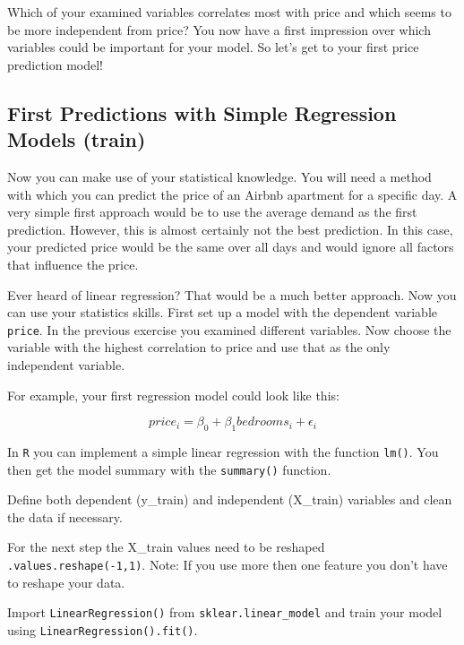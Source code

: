 \documentclass[
  11pt,
]{article}
\newenvironment{tips}[1]
  {
  \begin{itemize}
  \footnotesize
  \renewcommand{\labelitemi}{
    \raisebox{-.7\height}[0pt][0pt]{
      {\setkeys{Gin}{width=3em,keepaspectratio}
        \texttt{[image: images/\#1.png]}}
    }
  }
  \setlength{\fboxsep}{1em}
  \begin{rbox}
  \item
  }
  {
  \end{rbox}
  \end{itemize}
  }
\newenvironment{tipsp}[1]
  {
  \begin{itemize}
  \footnotesize
  \renewcommand{\labelitemi}{
    \raisebox{-.7\height}[0pt][0pt]{
      {\setkeys{Gin}{width=3em,keepaspectratio}
        \texttt{[image: images/\#1.png]}}
    }
  }
  \setlength{\fboxsep}{1em}
  \begin{pbox}
  \item
  }
  {
  \end{pbox}
  \end{itemize}
  }
\begin{document}
Which of your examined variables correlates most with price and which seems to be more independent from price? You now have a first impression over which variables could be important for your model. So let's get to your first price prediction model!

\hypertarget{first-predictions-with-simple-regression-models-train}{%
\subsection{First Predictions with Simple Regression Models (train)}\label{first-predictions-with-simple-regression-models-train}}

Now you can make use of your statistical knowledge. You will need a method with which you can predict the price of an Airbnb apartment for a specific day. A very simple first approach would be to use the average demand as the first prediction. However, this is almost certainly not the best prediction. In this case, your predicted price would be the same over all days and would ignore all factors that influence the price.

Ever heard of linear regression? That would be a much better approach. Now you can use your statistics skills. First set up a model with the dependent variable \texttt{price}. In the previous exercise you examined different variables. Now choose the variable with the highest correlation to price and use that as the only independent variable.

For example, your first regression model could look like this:

\[price_i = \beta_0 + \beta_1 bedrooms_i + \epsilon_i\]

\begin{tips}r
In \texttt{R} you can implement a simple linear regression with the function \texttt{lm()}. You then get the model summary with the \texttt{summary()} function.

\end{tips}

\begin{tipsp}p
Define both dependent (y\_train) and independent (X\_train) variables and clean the data if necessary.

For the next step the X\_train values need to be reshaped \texttt{.values.reshape(-1,1)}.
Note: If you use more then one feature you don't have to reshape your data.

Import \texttt{LinearRegression()} from \texttt{sklear.linear\_model} and train your model using \texttt{LinearRegression().fit()}.

\end{tipsp}
\end{document}
